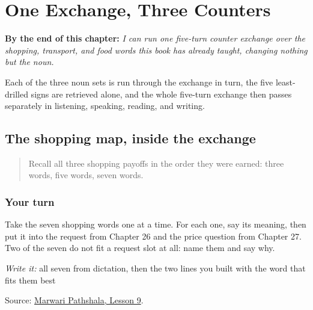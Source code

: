 
\chapter{One Exchange, Three Counters}
\label{ch:mw-counter-exchange}

\begin{chapteropening}
\textbf{By the end of this chapter:} \emph{I can run one five-turn counter exchange over the shopping, transport, and food words this book has already taught, changing nothing but the noun.}

Each of the three noun sets is run through the exchange in turn, the five least-drilled signs are retrieved alone, and the whole five-turn exchange then passes separately in listening, speaking, reading, and writing.
\end{chapteropening}

\section[Practice]{The shopping map, inside the exchange}

\label{lesson:MW-R26-shopping-counter}



\begin{quote}
Recall all three shopping payoffs in the order they were earned: three words, five words, seven words.
\end{quote}

\subsection*{Your turn}
Take the seven shopping words one at a time. For each one, say its meaning, then put it into the request from Chapter 26 and the price question from Chapter 27. Two of the seven do not fit a request slot at all: name them and say why.

\emph{Write it:} all seven from dictation, then the two lines you built with the word that fits them best

\begin{tcolorbox}[breakable,colback=teal!4,colframe=teal!35!black,title={Before you move on}]
Source: \href{https://www.marwaripathshala.com/marwari-lesson-9-english}{Marwari Pathshala, Lesson 9}.
\end{tcolorbox}
